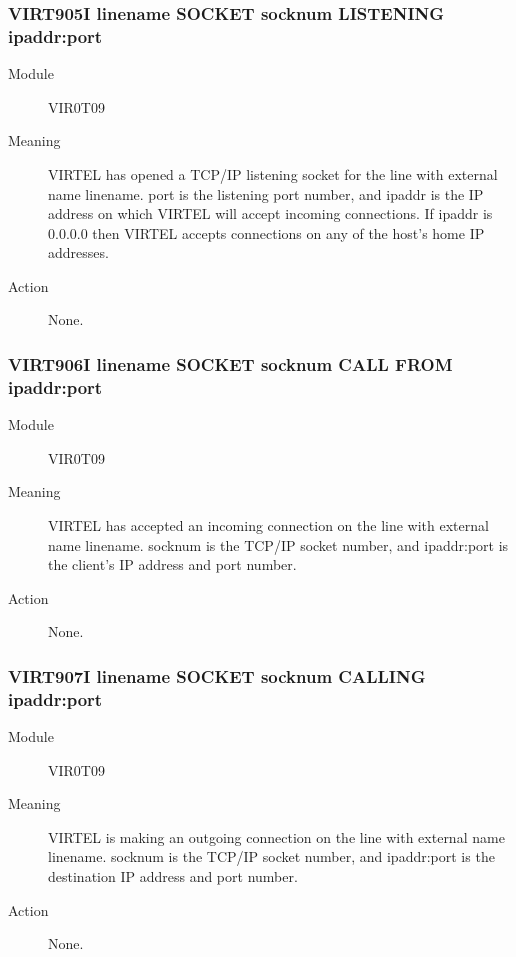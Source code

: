 \documentclass[letterpaper,10pt,english]{sphinxmanual}
\begin{document}
\subsubsection{VIRT905I linename SOCKET socknum LISTENING ipaddr:port}
\label{\detokenize{messages:virt905i-linename-socket-socknum-listening-ipaddr-port}}\begin{description}
\item[{Module}] \leavevmode
VIR0T09

\item[{Meaning}] \leavevmode
VIRTEL has opened a TCP/IP listening socket for the line with external name linename. port is the listening port number, and ipaddr is the IP address on which VIRTEL will accept incoming connections. If ipaddr is 0.0.0.0 then VIRTEL accepts connections on any of the host’s home IP addresses.

\item[{Action}] \leavevmode
None.

\end{description}


\subsubsection{VIRT906I linename SOCKET socknum CALL FROM ipaddr:port}
\label{\detokenize{messages:virt906i-linename-socket-socknum-call-from-ipaddr-port}}\begin{description}
\item[{Module}] \leavevmode
VIR0T09

\item[{Meaning}] \leavevmode
VIRTEL has accepted an incoming connection on the line with external name linename. socknum is the TCP/IP socket number, and ipaddr:port is the client’s IP address and port number.

\item[{Action}] \leavevmode
None.

\end{description}


\subsubsection{VIRT907I linename SOCKET socknum CALLING ipaddr:port}
\label{\detokenize{messages:virt907i-linename-socket-socknum-calling-ipaddr-port}}\begin{description}
\item[{Module}] \leavevmode
VIR0T09

\item[{Meaning}] \leavevmode
VIRTEL is making an outgoing connection on the line with external name linename. socknum is the TCP/IP socket number, and ipaddr:port is the destination IP address and port number.

\item[{Action}] \leavevmode
None.

\end{description}
\end{document}
